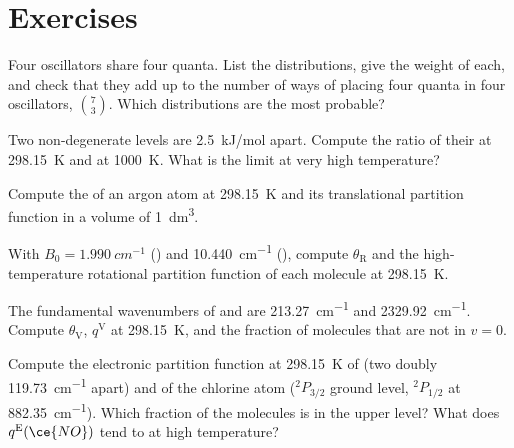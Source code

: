 \section{Exercises}

\begin{exercise}[$\star$]\label{exo:b3:partition-functions:1}
Four oscillators share four quanta. List the distributions, give the weight of
each, and check that they add up to the number of ways of placing four
 quanta in four oscillators, $\binom{7}{3}$. Which distributions are the
most probable?
\end{exercise}

\begin{exercise}[$\star$]\label{exo:b3:partition-functions:2}
Two non-degenerate levels are \qty{2.5}{kJ/mol} apart. Compute the ratio of their
 at \qty{298.15}{K} and at \qty{1000}{K}. What is the limit at very high
temperature?
\end{exercise}

\begin{exercise}[$\star$]\label{exo:b3:partition-functions:3}
Compute the  of an argon atom at \qty{298.15}{K} and its
translational partition function in a volume of \qty{1}{dm^3}.
\end{exercise}

\begin{exercise}[$\star$]\label{exo:b3:partition-functions:4}
With $B_0 = \qty{1.990}{cm^{-1}}$ () and \qty{10.440}{cm^{-1}} (), compute $\theta_{\mathrm R}$ and the
high-temperature rotational partition function of each molecule at
\qty{298.15}{K}.
\end{exercise}

\begin{exercise}[$\star\star$]\label{exo:b3:partition-functions:5}
The fundamental wavenumbers of  and  are \qty{213.27}{cm^{-1}} and
\qty{2329.92}{cm^{-1}}. Compute $\theta_{\mathrm V}$, $q^{\mathrm V}$ at \qty{298.15}{K}, and the fraction of molecules
that are not in $v = 0$.
\end{exercise}

\begin{exercise}[$\star\star$]\label{exo:b3:partition-functions:6}
Compute the electronic partition function at \qty{298.15}{K} of  (two doubly
 \qty{119.73}{cm^{-1}} apart) and of the chlorine atom (${}^2P_{3/2}$
ground level, ${}^2P_{1/2}$ at \qty{882.35}{cm^{-1}}). Which fraction of the  molecules is in
the upper level? What does $q^{\mathrm E}(\ce{NO})$ tend to at high temperature?
\end{exercise}

